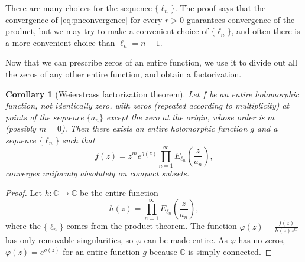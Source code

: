 \documentclass[12pt,openany]{book}
\newcommand{\C}{{\mathbb{C}}}
\theoremstyle{plain}
\newtheorem{cor}[thm]{Corollary}
\theoremstyle{remark}
\theoremstyle{definition}
\theoremstyle{exercise}
\theoremstyle{example}
\begin{document}
There are many choices for the sequence $\{ \ell_n \}$.  The proof says
that the convergence of \eqref{eq:pnconvergence} 
for every $r>0$ guarantees convergence of the product, but we may try
to make a convenient choice of $\{ \ell_n \}$, and often
there is a more convenient choice than $\ell_n=n-1$.

Now that we can prescribe zeros of an entire function, we
use it to divide out all the zeros of any other entire function, and
obtain a factorization.

\begin{cor}[Weierstrass factorization theorem]
Let $f$ be an entire holomorphic function, not identically zero,
with zeros (repeated according to multiplicity) at points of
the sequence $\{ a_n \}$ except the zero at
the origin, whose order is $m$ (possibly $m=0$).  Then there exists an
entire holomorphic function $g$ and a sequence $\{ \ell_n \}$ such that
\begin{equation*}
f(z) = z^m e^{g(z)} \prod_{n=1}^\infty E_{\ell_n}\left(\frac{z}{a_n}\right) ,
\end{equation*}
converges uniformly absolutely on compact subsets.
\end{cor}

\begin{proof}
Let $h \colon \C \to \C$ be the entire function
\begin{equation*}
h(z) = \prod_{n=1}^\infty E_{\ell_n}\left(\frac{z}{a_n}\right) ,
\end{equation*}
where the $\{ \ell_n \}$ comes from the product theorem.  The function
$\varphi(z) = \frac{f(z)}{h(z)z^m}$
has only removable singularities, so $\varphi$ can be made entire.
As $\varphi$ has no zeros, $\varphi(z) =
e^{g(z)}$ for an entire function $g$ because $\C$ is simply connected.
\end{proof}
\end{document}
